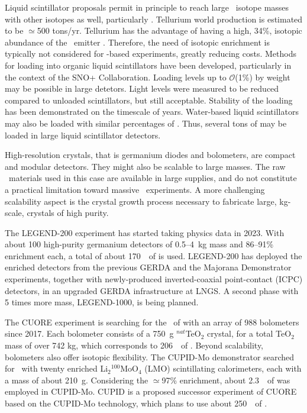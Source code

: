 Liquid scintillator proposals permit in principle to reach large \bbonu\ isotope masses with other isotopes as well, particularly . Tellurium world production is estimated to be $\simeq$500 tons/yr. Tellurium has the advantage of having a high, 34\%, isotopic abundance of the \bb\ emitter . Therefore, the need of isotopic enrichment is typically not considered for -based experiments, greatly reducing costs. Methods for loading  into organic liquid scintillators have been developed, particularly in the context of the SNO+ Collaboration. Loading levels up to $\mathcal{O}$(1\%)  by weight may be possible in large detetors. Light levels were measured to be reduced compared to unloaded scintillators, but still acceptable. Stability of the loading has been demonstrated on the timescale of years. Water-based liquid scintillators may also be loaded with similar percentages of . Thus, several tons of  may be loaded in large liquid scintillator detectors.

High-resolution crystals, that is germanium diodes and bolometers, are compact and modular detectors. They might also be scalable to large masses. The raw \bb\ materials used in this case are available in large supplies, and do not constitute a practical limitation toward massive \bbonu\ experiments. A more challenging scalability aspect is the crystal growth process necessary to fabricate large, kg-scale, crystals of high purity.   

The LEGEND-200 experiment has started taking physics data in 2023. With about 100 high-purity germanium detectors of 0.5--4~kg mass and 86--91\%  enrichment each, a total of about 170~\kgbb\ of  is used. LEGEND-200 has deployed the enriched detectors from the previous GERDA and the Majorana Demonstrator experiments, together with newly-produced inverted-coaxial point-contact (ICPC) detectors, in an upgraded GERDA infrastructure at LNGS. A second phase with 5 times more  mass, LEGEND-1000, is being planned.

The CUORE experiment is searching for the \bbonu\ of  with an array of 988 bolometers since 2017. Each bolometer consists of a 750~g $^{nat}$TeO$_2$ crystal, for a total TeO$_2$ mass of over 742 kg, which corresponds to 206~\kgbb\ of  \cite{CUORE:2021mvw}. Beyond scalability, bolometers also offer isotopic flexibility. The CUPID-Mo demonstrator \cite{Augier:2022znx} searched for  \bbonu\ with twenty enriched Li$_2$$^{100}$MoO$_4$ (LMO) scintillating calorimeters, each with a mass of about 210~g. Considering the $\simeq$97\%  enrichment, about 2.3~\kgbb\ of  was employed in CUPID-Mo. CUPID is a proposed successor experiment of CUORE based on the CUPID-Mo technology, which plans to use about 250~\kgbb\ of  \cite{CUPID:2019imh}.


